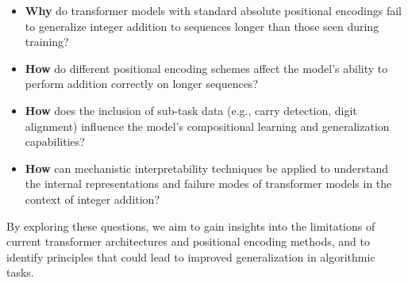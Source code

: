 \begin{itemize}
    \item \textbf{Why} do transformer models with standard absolute positional encodings fail to generalize integer addition to sequences longer than those seen during training?
    \item \textbf{How} do different positional encoding schemes affect the model's ability to perform addition correctly on longer sequences?
    \item \textbf{How} does the inclusion of sub-task data (e.g., carry detection, digit alignment) influence the model's compositional learning and generalization capabilities?
    \item \textbf{How} can mechanistic interpretability techniques be applied to understand the internal representations and failure modes of transformer models in the context of integer addition?
\end{itemize}

By exploring these questions, we aim to gain insights into the limitations of current transformer architectures and positional encoding methods, and to identify principles that could lead to improved generalization in algorithmic tasks.